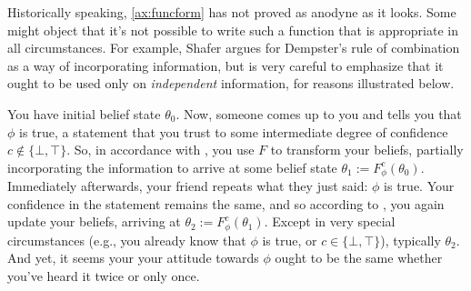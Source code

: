 \documentclass{article}
\begin{document}

Historically speaking, \cref{ax:funcform} has not proved as anodyne as it looks. 
Some might object that it's not possible to write such a function that is appropriate in all circumstances.
For example, Shafer argues for Dempster's rule of combination as a way of incorporating information, but is very careful to emphasize that it ought to be used only on \emph{independent} information, for reasons illustrated below. 



\begin{example}\label{ex:dupl}
	You have initial belief state $\theta_0$.
	Now, someone comes up to you and tells you that $\phi$ is true, a statement
		that you trust to some intermediate degree of confidence $c \notin\{ \bot, \top\}$. 
	So, in accordance with , you use $F$ to transform your beliefs, partially incorporating the information to arrive at some belief state $\theta_1 := F^c_\phi(\theta_0)$.
	Immediately afterwards, your friend repeats what they just said: $\phi$ is true. 
	Your confidence in the statement remains the same, and so according to 
	, you again update your beliefs, arriving at $\theta_2 := F^c_\phi(\theta_1)$. 
	Except in very special circumstances (e.g., you already know that $\phi$ is true, or $c \in \{\bot,\top\}$), typically $\theta_2$. 
	And yet, it seems your your attitude towards $\phi$ ought to be the same whether you've heard it twice or only once.
\end{example}
\end{document}
